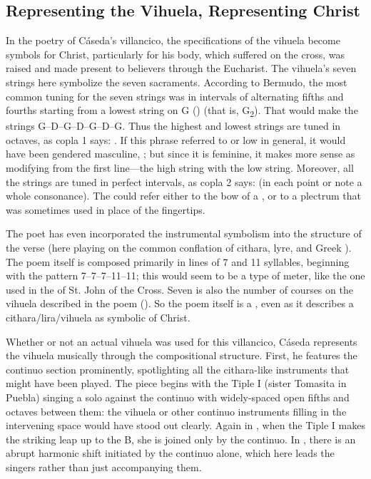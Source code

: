 \subsection{Representing the Vihuela, Representing Christ}

In the poetry of Cáseda's villancico, the specifications of the vihuela become symbols for Christ, particularly for his body, which suffered on the cross, was raised and made present to believers through the Eucharist.
The vihuela's seven strings here symbolize the seven sacraments.
According to Bermudo, the most common tuning for the seven strings was in intervals of alternating fifths and fourths starting from a lowest string on G () (that is, G\textsubscript{2}).%
	\autocite[109r--109v]{Bermudo:Declaracion}
That would make the strings G--D--G--D--G--D--G.
Thus the highest and lowest strings are tuned in octaves, as copla 1 says: .
If this phrase referred to  or low in general, it would have been gendered masculine, ; but since it is feminine, it makes more sense as modifying  from the first line---the high string with the low string.
Moreover, all the strings are tuned in perfect intervals, as copla 2 says:  (in each point or note a whole consonance).
The  could refer either to the bow of a , or to a plectrum that was sometimes used in place of the fingertips.

The poet has even incorporated the instrumental symbolism into the structure of the verse (here playing on the common conflation of cithara, lyre, and Greek ).
The poem itself is composed primarily in lines of 7 and 11 syllables, beginning with the pattern 7--7--7--11--11; this would seem to be a type of  meter, like the one used in the  of St. John of the Cross.
Seven is also the number of courses on the vihuela described in the poem ().
So the poem itself is a , even as it describes a cithara/lira/vihuela as symbolic of Christ.

Whether or not an actual vihuela was used for this villancico, Cáseda represents the vihuela musically through the compositional structure.
First, he features the continuo section prominently, spotlighting all the cithara-like instruments that might have been played.
The piece begins with the Tiple I (sister Tomasita in Puebla) singing a solo against the continuo with widely-spaced open fifths and octaves between them: the vihuela or other continuo instruments filling in the intervening space would have stood out clearly.
Again in , when the Tiple I makes the striking leap up to the B\fl{}, she is joined only by the continuo.
In , there is an abrupt harmonic shift initiated by the continuo alone, which here leads the singers rather than just accompanying them.

